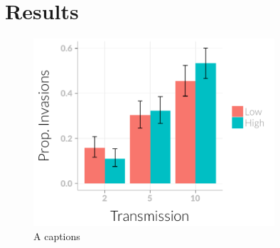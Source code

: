 
\clearpage
\section{Results}
































\begin{knitrout}
\color{fgcolor}\begin{figure}[t]

{\centering \includegraphics[width=0.8\textwidth]{figure/invasionPropPlots-1} 

}

\caption[A captions]{A captions}\label{f:AinvasionPropPlots}
\end{figure}


\end{knitrout}



